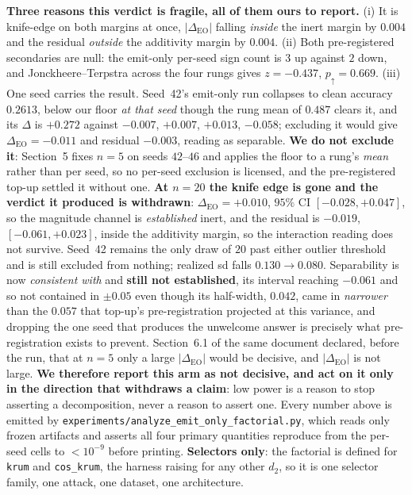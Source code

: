 \documentclass{article}
\begin{document}
\noindent \textbf{Three reasons this verdict is fragile, all of them ours to report.} (i) It is knife-edge on both margins at once, $|\Delta_{\mathrm{EO}}|$ falling \emph{inside} the inert margin by $0.004$ and the residual \emph{outside} the additivity margin by $0.004$. (ii) Both pre-registered secondaries are null: the emit-only per-seed sign count is $3$ up against $2$ down, and Jonckheere--Terpstra across the four rungs gives $z = -0.437$, $p_{\uparrow} = 0.669$. (iii) One seed carries the result. Seed~42's emit-only run collapses to clean accuracy $0.2613$, below our floor \emph{at that seed} though the rung mean of $0.487$ clears it, and its $\Delta$ is $+0.272$ against $-0.007$, $+0.007$, $+0.013$, $-0.058$; excluding it would give $\Delta_{\mathrm{EO}} = -0.011$ and residual $-0.003$, reading as separable. \textbf{We do not exclude it}: Section~5 fixes $n{=}5$ on seeds $42$--$46$ and applies the floor to a rung's \emph{mean} rather than per seed, so no per-seed exclusion is licensed, and the pre-registered top-up settled it without one. \textbf{At $n{=}20$ the knife edge is gone and the verdict it produced is withdrawn}: $\Delta_{\mathrm{EO}} = +0.010$, $95\%$ CI $[-0.028,+0.047]$, so the magnitude channel is \emph{established} inert, and the residual is $-0.019$, $[-0.061,+0.023]$, inside the additivity margin, so the interaction reading does not survive. Seed~42 remains the only draw of $20$ past either outlier threshold and is still excluded from nothing; realized sd falls $0.130 \to 0.080$. Separability is now \emph{consistent with} and \textbf{still not established}, its interval reaching $-0.061$ and so not contained in $\pm0.05$ even though its half-width, $0.042$, came in \emph{narrower} than the $0.057$ that top-up's pre-registration projected at this variance, and dropping the one seed that produces the unwelcome answer is precisely what pre-registration exists to prevent. Section~6.1 of the same document declared, before the run, that at $n{=}5$ only a large $|\Delta_{\mathrm{EO}}|$ would be decisive, and $|\Delta_{\mathrm{EO}}|$ is not large. \textbf{We therefore report this arm as not decisive, and act on it only in the direction that withdraws a claim}: low power is a reason to stop asserting a decomposition, never a reason to assert one. Every number above is emitted by \texttt{experiments/\allowbreak analyze\_emit\_only\_factorial.py}, which reads only frozen artifacts and asserts all four primary quantities reproduce from the per-seed cells to $<10^{-9}$ before printing. \textbf{Selectors only}: the factorial is defined for \texttt{krum} and \texttt{cos\_krum}, the harness raising for any other $d_2$, so it is one selector family, one attack, one dataset, one architecture.
\end{document}
